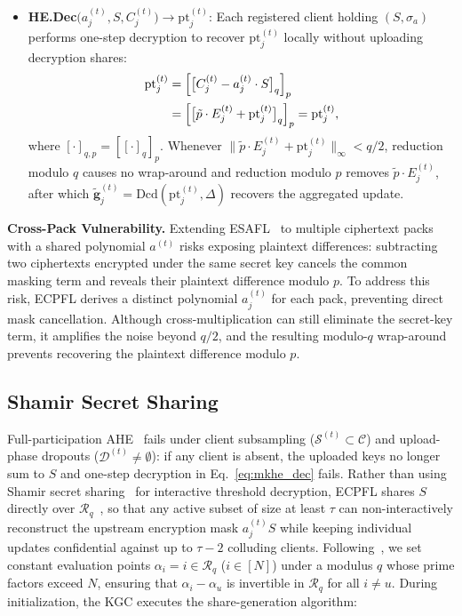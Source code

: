 \begin{itemize}[leftmargin=*]
\item  \textbf{HE.Dec}$\bigl(a_j^{(t)}, S, C_j^{(t)}\bigr) \to \mathrm{pt}_j^{(t)}$: Each registered client holding $(S, \sigma_a)$ performs one-step decryption to recover $\mathrm{pt}_j^{(t)}$ locally without uploading decryption shares:
\begin{align}
\mathrm{pt}_j^{(t)} &= \Bigl[\bigl[C_j^{(t)} - a_j^{(t)} \cdot S\bigr]_q\Bigr]_p \notag \\
&= \Bigl[\bigl[\tilde{p} \cdot E_j^{(t)} + \mathrm{pt}_j^{(t)}\bigr]_q\Bigr]_p = \mathrm{pt}_j^{(t)},
\label{eq:mkhe_dec}
\end{align}
where $[\cdot]_{q,p} = [[\cdot]_q]_p$. Whenever $\|\tilde{p} \cdot E_j^{(t)} + \mathrm{pt}_j^{(t)}\|_\infty < q/2$, reduction modulo $q$ causes no wrap-around and reduction modulo $p$ removes $\tilde{p} \cdot E_j^{(t)}$, after which $\tilde{\mathbf{g}}_j^{(t)} = \mathrm{Dcd}(\mathrm{pt}_j^{(t)}, \Delta)$ recovers the aggregated update.
\end{itemize}

\textbf{Cross-Pack Vulnerability.} Extending ESAFL~\cite{wu2025esafl} to multiple ciphertext packs with a shared polynomial $a^{(t)}$ risks exposing plaintext differences: subtracting two ciphertexts encrypted under the same secret key cancels the common masking term and reveals their plaintext difference modulo $p$. To address this risk, \textsc{ECPFL} derives a distinct polynomial $a_j^{(t)}$ for each pack, preventing direct mask cancellation. Although cross-multiplication can still eliminate the secret-key term, it amplifies the noise beyond $q/2$, and the resulting modulo-$q$ wrap-around prevents recovering the plaintext difference modulo $p$.

\subsection{Shamir Secret Sharing}
\label{sec:shamir}
Full-participation AHE~\cite{wu2025esafl} fails under client subsampling ($\mathcal{S}^{(t)} \subset \mathcal{C}$) and upload-phase dropouts ($\mathcal{D}^{(t)} \neq \emptyset$): if any client is absent, the uploaded keys no longer sum to $S$ and one-step decryption in Eq.~\eqref{eq:mkhe_dec} fails. Rather than using Shamir secret sharing~\cite{shamir1979how} for interactive threshold decryption, \textsc{ECPFL} shares $S$ directly over $\mathcal{R}_q$~\cite{mouchet2023threshold}, \cite{colin2026tfhesd} so that any active subset of size at least $\tau$ can non-interactively reconstruct the upstream encryption mask $a_j^{(t)}S$ while keeping individual updates confidential against up to $\tau-2$ colluding clients. Following~\cite{mouchet2023threshold}, we set constant evaluation points $\alpha_i = i \in \mathcal{R}_q$ ($i \in [N]$) under a modulus $q$ whose prime factors exceed $N$, ensuring that $\alpha_i - \alpha_u$ is invertible in $\mathcal{R}_q$ for all $i \neq u$. During initialization, the KGC executes the share-generation algorithm:

